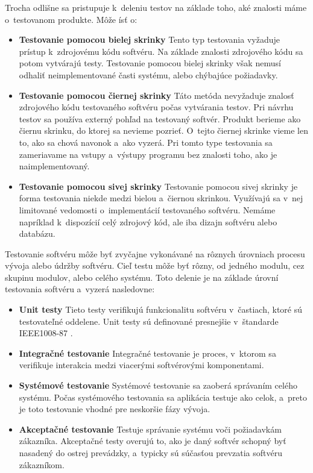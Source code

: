 \noindent Trocha odlišne sa pristupuje k~deleniu testov na základe toho, 
aké znalosti máme o~testovanom produkte. Môže ísť o:
\begin{itemize}
\item \textbf{Testovanie pomocou bielej skrinky}
Tento typ testovania vyžaduje prístup k~zdrojovému kódu softvéru. 
Na základe znalosti zdrojového kódu sa potom vytvárajú testy.
Testovanie pomocou bielej skrinky však nemusí odhaliť neimplementované 
časti systému, alebo chýbajúce požiadavky.

\item \textbf{Testovanie pomocou čiernej skrinky} 
\label{sekcia:cierna_skrinka}
Táto metóda nevyžaduje znalosť zdrojového kódu testovaného softvéru 
počas vytvárania testov. Pri návrhu testov sa používa externý pohľad na 
testovaný softvér.  Produkt berieme ako čiernu skrinku, do ktorej sa 
nevieme pozrieť. O~tejto čiernej skrinke vieme len to, ako sa chová 
navonok a~ako vyzerá. Pri tomto type testovania sa zameriavame na vstupy 
a~výstupy programu bez znalosti toho, ako je naimplementovaný.

\item \textbf{Testovanie pomocou sivej skrinky}
\label{sekcia:siva_skrinka}
Testovanie pomocou sivej skrinky je forma testovania niekde medzi bielou
a~čiernou skrinkou. Využívajú sa v~nej limitované vedomosti 
o~implementácií testovaného softvéru. Nemáme napríklad k~dispozícií celý
zdrojový kód, ale iba dizajn softvéru alebo databázu.
\end{itemize}

\noindent Testovanie softvéru môže byť zvyčajne vykonávané na rôznych úrovniach 
procesu vývoja alebo údržby softvéru. Cieľ testu môže byť rôzny, od jedného
modulu, cez skupinu modulov, alebo celého systému.
Toto delenie je na základe úrovní testovania softvéru a~vyzerá nasledovne:
\begin{itemize}
\item \textbf{Unit testy}
Tieto testy verifikujú funkcionalitu softvéru v~častiach, ktoré sú 
testovateľné oddelene.
Unit testy sú definované presnejšie v~štandarde IEEE1008-87 \cite{Ieee_unit}.

\item \textbf{Integračné testovanie}
Integračné testovanie je proces, v~ktorom sa verifikuje interakcia medzi 
viacerými softvérovými komponentami.

\item \textbf{Systémové testovanie}
Systémové testovanie sa zaoberá správaním celého systému. Počas 
systémového testovania sa aplikácia testuje ako celok, a~preto je toto 
testovanie vhodné pre neskoršie fázy vývoja.

\item \textbf{Akceptačné testovanie}
Testuje správanie systému voči požiadavkám zákazníka. Akceptačné testy 
overujú to, ako je daný softvér schopný byť nasadený do ostrej prevádzky, 
a~typicky sú súčasťou prevzatia softvéru zákazníkom.
\end{itemize}

